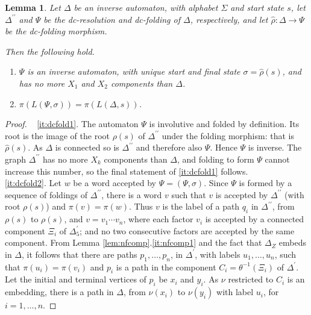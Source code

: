 \documentclass[a4paper,12pt]{article}
\newcommand{\D}{\Delta }
\newcommand{\s}{\sigma }
\renewcommand{\S}{\Sigma }
\newtheorem{lemma}[theorem]{Lemma}
\numberwithin{equation}{section}
\numberwithin{figure}{section}
\newcommand{\maps}{\rightarrow}
\newcommand{\be}{\begin{enumerate}}
\newcommand{\ee}{\end{enumerate}}
\begin{document}
\begin{lemma}\label{lem:dcfold}
Let $\D$ be  an inverse automaton, with alphabet $\S$ and start
state $s$, let $\D^{\prime\prime}$  and $\Psi$ be the
dc-resolution and dc-folding of $\D$, respectively, and
let $\hat\rho:\D\maps \Psi$ be the dc-folding morphism.

 Then the following hold.
\be
\item
\label{it:dcfold1} $\Psi$ is an inverse automaton, with unique
start and  final state $\s=\hat\rho(s)$, and has no more $X_1$ and
$X_2$ components than $\D$.
\item \label{it:dcfold2}
$\pi(L(\Psi,\s))=\pi(L(\D,s))$.
\ee
\end{lemma}
\begin{proof} ~
\ref{it:dcfold1}.
The automaton $\Psi$ is involutive and folded by definition.
 Its root is the image of the root $\rho(s)$ of $\D^{\prime\prime}$ under
 the folding morphism: that is $\hat\rho(s)$.
 As
$\D$ is connected  so is $\D^{\prime\prime}$ and therefore also
$\Psi$. Hence $\Psi$ is inverse. The graph 
$\D^{\prime\prime}$  has  no more $X_k$ components than $\D$, and 
folding to form $\Psi$ cannot increase this number, so the final
statement of \ref{it:dcfold1} follows.
 \\[1em]
\ref{it:dcfold2}. Let $w$ be a word accepted by $\Psi=(\Psi,\s)$. Since
$\Psi$ is formed by a sequence of foldings of $\D^{\prime\prime}$,
there is a word $v$ such that $v$ is accepted by
$\D^{\prime\prime}$ (with root $\rho(s)$) and $\pi(v)=\pi(w)$.
Thus $v$ is the label of a path $q_i$ in $\D^{\prime\prime}$, from  $\rho(s)$
to $\rho(s)$, and
 $v=v_1\cdots v_n$,
where each factor $v_i$ is accepted by a connected component $\Xi_i$ of
$\D^\prime_5$;  and no two consecutive factors are accepted by the
same component. From Lemma \ref{lem:nfcomp}.\ref{it:nfcomp1} and the 
fact that $\D_Z$ embeds in $\D$,  it
follows that there are paths $p_1,\ldots, p_n$, in $\D^\prime$,
with labels
 $u_1,\ldots , u_n$, such that
$\pi(u_i)=\pi(v_i)$ and
$p_i$ is a path in the component
$C_i=\theta^{-1}(\Xi_i)$ of $\D^\prime$.
Let the initial and terminal vertices of $p_i$ be $x_i$ and  $y_i$.
As $\nu$ restricted to $C_i$ is an embedding, there is a path in $\D$,  from
$\nu(x_i)$ to $\nu(y_i)$ with label $u_i$, for $i=1,\ldots, n$.


\end{proof}
\end{document}
